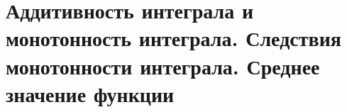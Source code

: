 \section{Аддитивность интеграла и монотонность интеграла. Следствия монотонности интеграла. Среднее значение функции}
